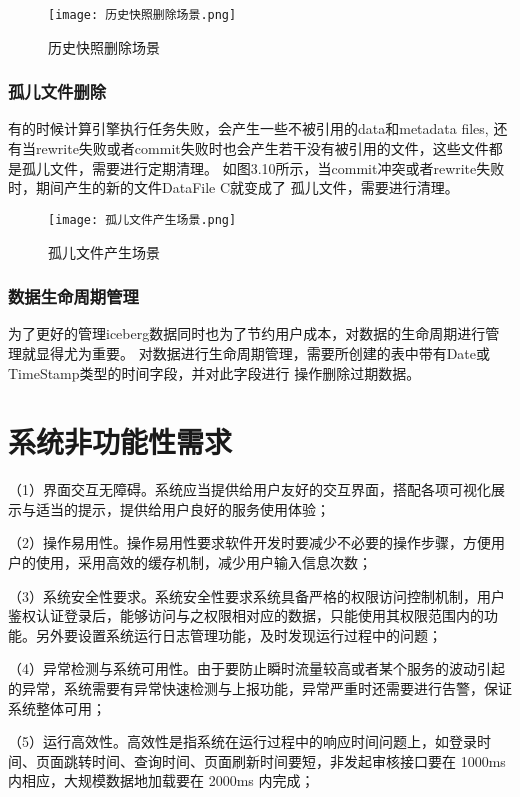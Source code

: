 \begin{figure}[h]
  \centering
  \texttt{[image: 历史快照删除场景.png]}
  \caption{历史快照删除场景}
  \label{fig:badge}
\end{figure}

\subsubsection{孤儿文件删除}

有的时候计算引擎执行任务失败，会产生一些不被引用的data和metadata files,
还有当rewrite失败或者commit失败时也会产生若干没有被引用的文件，这些文件都是孤儿文件，需要进行定期清理。
如图3.10所示，当commit冲突或者rewrite失败时，期间产生的新的文件DataFile C就变成了
孤儿文件，需要进行清理。

\begin{figure}[h]
  \centering
  \texttt{[image: 孤儿文件产生场景.png]}
  \caption{孤儿文件产生场景}
  \label{fig:badge}
\end{figure}

\subsubsection{数据生命周期管理}

为了更好的管理iceberg数据同时也为了节约用户成本，对数据的生命周期进行管理就显得尤为重要。
对数据进行生命周期管理，需要所创建的表中带有Date或TimeStamp类型的时间字段，并对此字段进行
操作删除过期数据。

\section{系统非功能性需求}

（1）界面交互无障碍。系统应当提供给用户友好的交互界面，搭配各项可视化展示与适当的提示，提供给用户良好的服务使用体验；

（2）操作易用性。操作易用性要求软件开发时要减少不必要的操作步骤，方便用户的使用，采用高效的缓存机制，减少用户输入信息次数；

（3）系统安全性要求。系统安全性要求系统具备严格的权限访问控制机制，用户鉴权认证登录后，能够访问与之权限相对应的数据，只能使用其权限范围内的功能。另外要设置系统运行日志管理功能，及时发现运行过程中的问题；

（4）异常检测与系统可用性。由于要防止瞬时流量较高或者某个服务的波动引起的异常，系统需要有异常快速检测与上报功能，异常严重时还需要进行告警，保证系统整体可用；

（5）运行高效性。高效性是指系统在运行过程中的响应时间问题上，如登录时间、页面跳转时间、查询时间、页面刷新时间要短，非发起审核接口要在 1000ms 内相应，大规模数据地加载要在 2000ms 内完成；


